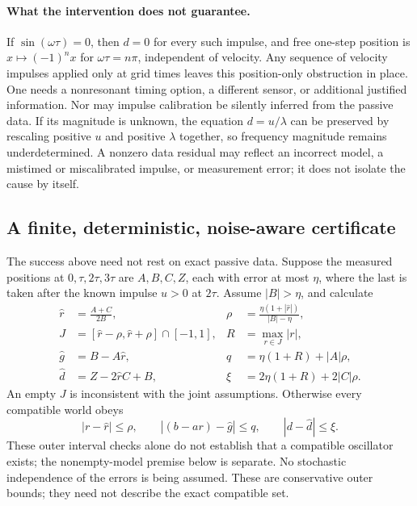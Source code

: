 \documentclass[11pt]{article}
\theoremstyle{definition}
\begin{document}
\paragraph{What the intervention does not guarantee.}
If $\sin(\omega\tau)=0$, then $d=0$ for every such impulse, and free
one-step position is $x\mapsto(-1)^n x$ for $\omega\tau=n\pi$,
independent of velocity. Any sequence of velocity impulses applied only
at grid times leaves this position-only obstruction in place. One needs a
nonresonant timing option, a different sensor, or additional justified
information. Nor may impulse calibration be silently inferred from the
passive data. If its magnitude is unknown, the equation $d=u/\lambda$
can be preserved by rescaling positive $u$ and positive $\lambda$ together,
so frequency magnitude remains underdetermined. A nonzero data residual
may reflect an incorrect model, a mistimed or miscalibrated impulse, or
measurement error; it does not isolate the cause by itself.

\subsection{A finite, deterministic, noise-aware certificate}

The success above need not rest on exact passive data. Suppose the measured
positions at $0,\tau,2\tau,3\tau$ are $A,B,C,Z$, each with error at most
$\eta$, where the last is taken after the known impulse $u>0$ at $2\tau$.
Assume $|B|>\eta$, and calculate
\begin{align*}
 \widehat r&=\frac{A+C}{2B},&
 \rho&=\frac{\eta(1+|\widehat r|)}{|B|-\eta},\\
 J&=[\widehat r-\rho,\widehat r+\rho]\cap[-1,1],&
 R&=\max_{r\in J}|r|,\\
 \widehat g&=B-A\widehat r,&
 q&=\eta(1+R)+|A|\rho,\\
 \widehat d&=Z-2\widehat rC+B,&
 \xi&=2\eta(1+R)+2|C|\rho.
\end{align*}
An empty $J$ is inconsistent with the joint assumptions. Otherwise every
compatible world obeys
\begin{equation}\label{eq:sci-interval-controls}
 |r-\widehat r|\leq\rho,\qquad
 |(b-ar)-\widehat g|\leq q,\qquad
 |d-\widehat d|\leq\xi.
\end{equation}
These outer interval checks alone do not establish that a compatible oscillator exists; the nonempty-model premise below is separate. No stochastic independence of the errors is being assumed. These are
conservative outer bounds; they need not describe the exact compatible set.
\end{document}

